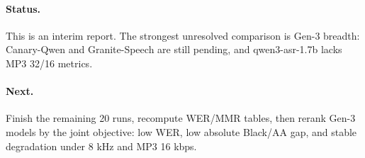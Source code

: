 \documentclass[11pt]{article}
\begin{document}
\paragraph{Status.}
This is an interim report. The strongest unresolved comparison is Gen-3 breadth: Canary-Qwen and Granite-Speech are still pending, and qwen3-asr-1.7b lacks MP3 32/16 metrics.

\paragraph{Next.}
Finish the remaining 20 runs, recompute WER/MMR tables, then rerank Gen-3 models by the joint objective: low WER, low absolute Black/AA gap, and stable degradation under 8 kHz and MP3 16 kbps.


\end{document}
